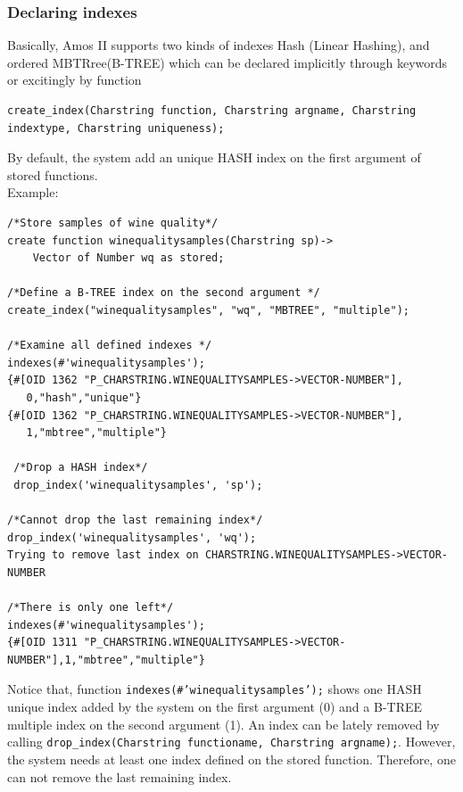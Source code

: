 \documentclass[12pt]{article}
\begin{document}
\subsubsection{Declaring indexes}
Basically, Amos II supports two kinds of indexes Hash (Linear Hashing), and ordered MBTRree(B-TREE) which can be declared implicitly through keywords or excitingly by function
\begin{lstlisting}[caption=Signature of AMOSQL function create\_index]
create_index(Charstring function, Charstring argname, Charstring indextype, Charstring uniqueness);
\end{lstlisting}
 By default, the system add an unique HASH index on the first argument of stored functions.\\
 Example:
\begin{lstlisting}[caption=Indexes on a stored function]
/*Store samples of wine quality*/
create function winequalitysamples(Charstring sp)->
	Vector of Number wq as stored;

/*Define a B-TREE index on the second argument */
create_index("winequalitysamples", "wq", "MBTREE", "multiple");

/*Examine all defined indexes */
indexes(#'winequalitysamples');
{#[OID 1362 "P_CHARSTRING.WINEQUALITYSAMPLES->VECTOR-NUMBER"],
   0,"hash","unique"}
{#[OID 1362 "P_CHARSTRING.WINEQUALITYSAMPLES->VECTOR-NUMBER"],
   1,"mbtree","multiple"}

 /*Drop a HASH index*/
 drop_index('winequalitysamples', 'sp');

/*Cannot drop the last remaining index*/
drop_index('winequalitysamples', 'wq');
Trying to remove last index on CHARSTRING.WINEQUALITYSAMPLES->VECTOR-NUMBER

/*There is only one left*/
indexes(#'winequalitysamples');
{#[OID 1311 "P_CHARSTRING.WINEQUALITYSAMPLES->VECTOR-NUMBER"],1,"mbtree","multiple"}
\end{lstlisting}
Notice that, function \texttt{indexes(\#'winequalitysamples');} shows one HASH unique index added by the system on the first argument (0)  and a B-TREE multiple index on the second argument (1). An index can be lately removed by calling \texttt{drop\_index(Charstring functioname, Charstring argname);}. However, the system needs at least one index defined on the stored function. Therefore, one can not remove the last remaining index.
\end{document}
